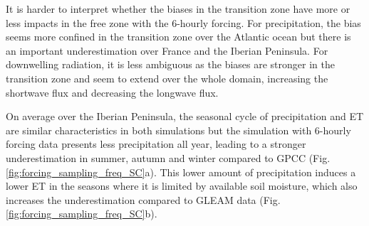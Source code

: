 It is harder to interpret whether the biases in the transition zone have more or less impacts in the free zone with the 6-hourly forcing. For precipitation, the bias seems more confined in the transition zone over the Atlantic ocean but there is an important underestimation over France and the Iberian Peninsula. For downwelling radiation, it is less ambiguous as the biases are stronger in the transition zone and seem to extend over the whole domain, increasing the shortwave flux and decreasing the longwave flux.

On average over the Iberian Peninsula, the seasonal cycle of precipitation and ET are similar characteristics in both simulations but the simulation with 6-hourly forcing data presents less precipitation all year, leading to a stronger underestimation in summer, autumn and winter compared to GPCC (Fig. \ref{fig:forcing_sampling_freq_SC}a). This lower amount of precipitation induces a lower ET in the seasons where it is limited by available soil moisture, which also increases the underestimation compared to GLEAM data (Fig. \ref{fig:forcing_sampling_freq_SC}b). 

